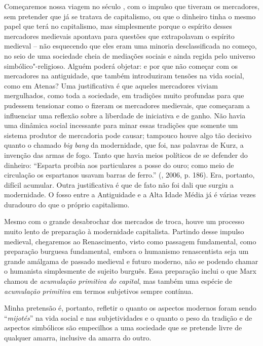Começaremos nossa viagem no século , com o impulso que tiveram os mercadores, sem
pretender que já se tratava de capitalismo, ou que o dinheiro tinha o
mesmo papel que terá no capitalismo, mas simplesmente porque o espírito
desses mercadores medievais apontava para questões que extrapolavam o
espírito medieval -- não esquecendo que eles eram uma minoria
desclassificada no começo, no seio de uma sociedade cheia de mediações
sociais e ainda regida pelo universo simbólico"-religioso. Alguém poderá
objetar: e por que não começar com os mercadores na antiguidade, que
também introduziram tensões na vida social, como em Atenas? Uma
justificativa é que aqueles mercadores viviam mergulhados, como toda a
sociedade, em tradições muito profundas para que pudessem tensionar como
o fizeram os mercadores medievais, que começaram a influenciar uma
reflexão sobre a liberdade de iniciativa e de ganho. Não havia uma
dinâmica social incessante para minar essas tradições que somente um
sistema produtor de mercadoria pode causar; tampouco houve algo tão
decisivo quanto o chamado \emph{big bang} da modernidade, que foi, nas
palavras de Kurz, a invenção das armas de fogo. Tanto que havia
meios políticos de se defender do dinheiro: ``Esparta proibia aos
particulares a posse do ouro; como meio de circulação os espartanos
usavam barras de ferro.'' (, 2006, p. 186). Era, portanto, difícil
acumular. Outra justificativa é que de fato não foi dali que surgiu a
modernidade. O fosso entre a Antiguidade e a Alta Idade Média já é
várias vezes duradouro do que o próprio capitalismo.

Mesmo com o grande desabrochar dos mercados de troca, houve um processo
muito lento de preparação à modernidade capitalista. Partindo desse
impulso medieval, chegaremos ao Renascimento, visto como passagem
fundamental, como preparação burguesa fundamental, embora o humanismo
renascentista seja um grande amálgama de passado medieval e futuro
moderno, não se podendo chamar o humanista simplesmente de sujeito
burguês. Essa preparação inclui o que Marx chamou de \emph{acumulação
primitiva do capital}, mas também uma espécie de
\emph{acumulação} \emph{primitiva} em termos subjetivos sempre contínua.

Minha pretensão é, portanto, refletir o quanto os aspectos modernos foram
sendo ``\emph{mijotés}'' na vida social e nas subjetividades e o quanto
o peso da tradição e de aspectos simbólicos são empecilhos a uma
sociedade que se pretende livre de qualquer amarra, inclusive da amarra
do outro.

